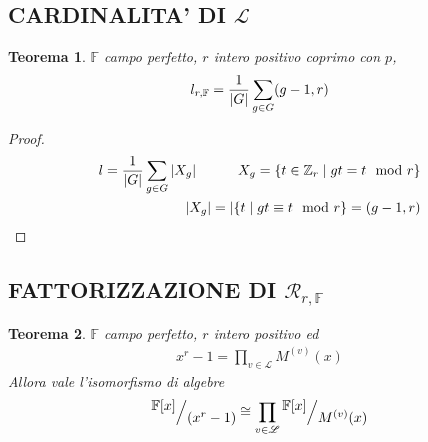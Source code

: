 \documentclass[mathserif]{beamer}
\def\quotient#1#2{%
   \raise1ex\hbox{$#1$}\Big/\lower1ex\hbox{$#2$}%
}
\newtheorem{teorema}{Teorema}
\begin{document}
\subsection{CARDINALITA' DI  $\mathscr{L}$ }
\begin{frame}
   \begin{teorema}
	$\mathbb{F}$ campo perfetto, $r$ intero positivo coprimo con $p$,
	\begin{align*}
	  l_{r,\mathbb{F}} = \frac{1}{\arrowvert G \arrowvert }\sum_{g \in G} (g-1, r) 
	\end{align*}
    \end{teorema}
    \begin{proof}
	\begin{align*}
	  l = \frac{1}{\arrowvert G \arrowvert }\sum_{g \in G}\arrowvert X_{g} \arrowvert \qquad \quad 
 	   X_{g} = \lbrace t \in \mathbb{Z}_{r} \mid gt = t \mod r \rbrace 
 	   \\
 	   \arrowvert X_{g} \arrowvert = \arrowvert \lbrace t \mid  gt \equiv t \mod{r} \rbrace = (g-1, r)
	\end{align*}
    \end{proof}
\end{frame}


\subsection{FATTORIZZAZIONE DI $\mathcal{R}_{r,\mathbb{F}}$ }
\begin{frame}
      \begin{teorema}
        $\mathbb{F}$ campo perfetto, $r$ intero positivo ed 
	\begin{align*}
	      x^r-1 = \prod_{v\in \mathscr{L}} M^{(v)}(x) 
	\end{align*}
       Allora vale l'isomorfismo di algebre
	\begin{align*}
	    \quotient{\mathbb{F} \lbrack x \rbrack  }{(x^{r} - 1)}
	    \cong
	    \prod_{v\in \mathscr{L}} \quotient{\mathbb{F} \lbrack x \rbrack  }{M^{(v)}(x)}
	\end{align*}
      \end{teorema}
\end{frame}
\end{document}
